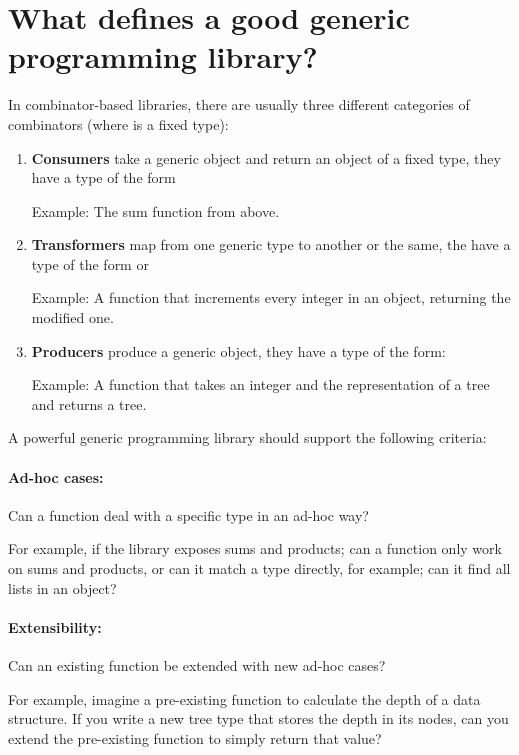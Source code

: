 \section*{What defines a good generic programming library?}

In combinator-based libraries, there are usually three different categories of
combinators (where  is a fixed type):

\begin{enumerate}
    \item \textbf{Consumers} take a generic object and return an object of a fixed type, they have
           a type of the form 

           Example: The sum function from above.

    \item \textbf{Transformers} map from one generic type to another or the same, the have a type of the form
             or 


            Example: A function that increments every integer in an object, returning the modified one.

    \item \textbf{Producers} produce a generic object, they have a type of the form: 

            Example: A function that takes an integer and the representation of
                     a tree and returns a tree.
\end{enumerate}


A powerful generic programming library should support the following criteria:

\paragraph{Ad-hoc cases:} Can a function deal with a specific type in an ad-hoc way?

For example, if the library exposes sums and products; can a function
only work on sums and products, or can it match a type directly, for
example; can it find all lists in an object?

\paragraph{Extensibility:} Can an existing function be extended with new ad-hoc cases?

For example, imagine a pre-existing function to calculate the depth of a data
structure. If you write a new tree type that stores the depth in its nodes, can
you extend the pre-existing function to simply return that value?

